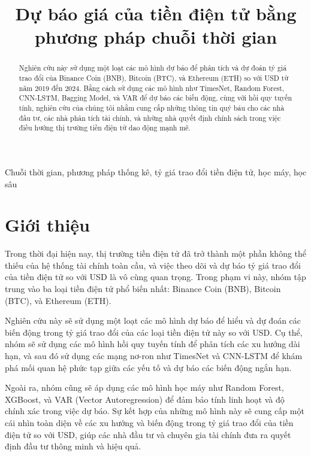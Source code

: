 \documentclass[conference]{IEEEtran}
\begin{document}
	
	\title{Dự báo giá của tiền điện tử bằng phương pháp chuỗi thời gian}
	\maketitle
	
	\begin{abstract}
		Nghiên cứu này sử dụng một loạt các mô hình dự báo để phân tích và dự đoán tỷ giá trao đổi của Binance Coin (BNB), Bitcoin (BTC), và Ethereum (ETH) so với USD từ năm 2019 đến 2024. Bằng cách sử dụng các mô hình như TimesNet, Random Forest, CNN-LSTM, Bagging Model, và VAR để dự báo các biến động, cùng với hồi quy tuyến tính, nghiên cứu của chúng tôi nhằm cung cấp những thông tin quý báu cho các nhà đầu tư, các nhà phân tích tài chính, và những nhà quyết định chính sách trong việc điều hướng thị trường tiền điện tử dao động mạnh mẽ.
	\end{abstract}
	
	\begin{IEEEkeywords}
		Chuỗi thời gian, phương pháp thống kê, tỷ giá trao đổi tiền điện tử, học máy, học sâu
	\end{IEEEkeywords}
	
	\section{Giới thiệu}
	Trong thời đại hiện nay, thị trường tiền điện tử đã trở thành một phần không thể thiếu của hệ thống tài chính toàn cầu, và việc theo dõi và dự báo tỷ giá trao đổi của tiền điện tử so với USD là vô cùng quan trọng. Trong phạm vi này, nhóm tập trung vào ba loại tiền điện tử phổ biến nhất: Binance Coin (BNB), Bitcoin (BTC), và Ethereum (ETH).
	
	Nghiên cứu này sẽ sử dụng một loạt các mô hình dự báo để hiểu và dự đoán các biến động trong tỷ giá trao đổi của các loại tiền điện tử này so với USD. Cụ thể, nhóm sẽ sử dụng các mô hình hồi quy tuyến tính để phân tích các xu hướng dài hạn, và sau đó sử dụng các mạng nơ-ron như TimesNet và CNN-LSTM để khám phá mối quan hệ phức tạp giữa các yếu tố và dự báo các biến động ngắn hạn.
	
	Ngoài ra, nhóm cũng sẽ áp dụng các mô hình học máy như Random Forest, XGBoost, và VAR (Vector Autoregression) để đảm bảo tính linh hoạt và độ chính xác trong việc dự báo. Sự kết hợp của những mô hình này sẽ cung cấp một cái nhìn toàn diện về các xu hướng và biến động trong tỷ giá trao đổi của tiền điện tử so với USD, giúp các nhà đầu tư và chuyên gia tài chính đưa ra quyết định đầu tư thông minh và hiệu quả.
	
\end{document}
